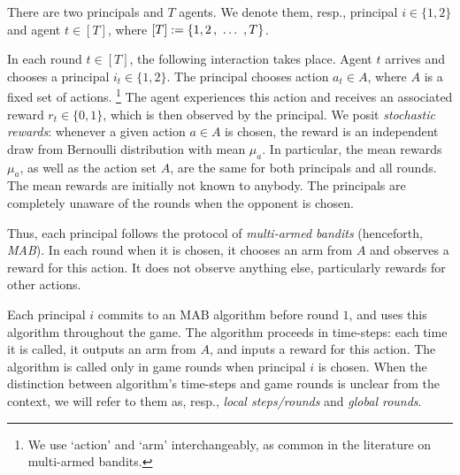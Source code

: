  There are two principals and $T$ agents. We denote them, resp., principal $i\in \{1,2\}$ and agent $t\in [T]$,
where $[T] := \{1,2\, ,\ \ldots\ , T\}$.

In each round $t\in [T]$, the following  interaction takes place. Agent $t$ arrives and chooses a principal $i_t\in \{1,2\}$. The principal chooses action $a_t\in A$, where $A$ is a fixed set of actions.%
\footnote{We use `action' and `arm' interchangeably, as common in the literature on multi-armed bandits.}
The agent experiences this action and receives an associated reward $r_t\in \{ 0,1\}$, which is then observed by the principal. We posit \emph{stochastic rewards}: whenever a given action $a\in A$ is chosen, the reward is an independent draw from Bernoulli distribution with mean $\mu_a$. In particular, the mean rewards $\mu_a$, as well as the action set $A$, are the same for both principals and all rounds. The mean rewards are initially not known to anybody. The principals are completely unaware of the rounds when the opponent is chosen.




Thus, each principal follows the protocol of \emph{multi-armed bandits} (henceforth, \emph{MAB}). In each round when it is chosen, it chooses an arm from $A$ and observes a reward for this action. It does not observe anything else, particularly rewards for other actions.

Each principal $i$ commits to an MAB algorithm \alg[i] before round $1$, and uses this algorithm throughout the game. The algorithm proceeds in time-steps:
each time it is called, it outputs an arm from $A$, and inputs a reward for this action. The algorithm is called only in game rounds when principal $i$ is chosen.
When the distinction between algorithm's time-steps and game rounds is unclear from the context, we will refer to them as, resp., \emph{local steps/rounds} and \emph{global rounds}.

\newcommand{\est}{\mathtt{EST}}


